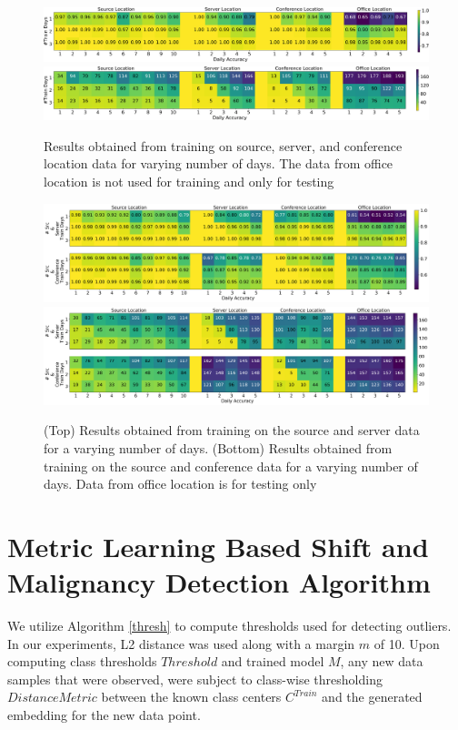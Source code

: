 \documentclass{article}
\begin{document}
\begin{figure}[H]
\includegraphics[width=\linewidth]{figures_supp/Exp2.png} 
\includegraphics[width=\linewidth]{figures_supp/Exp4.png} 
\caption{Results obtained from training on source, server, and conference location data for varying number of days. The data from office location is not used for training and only for testing}
\label{srctrg}
\end{figure}

\begin{figure}[H]
\includegraphics[width=\linewidth]{figures_supp/Exp5.png} 
\includegraphics[width=\linewidth]{figures_supp/Exp5-metric.png} 
\caption{(Top) Results obtained from training on the source and server data for a varying number of days. (Bottom) Results obtained from training on the source and conference data for a varying number of days. Data from office location is for testing only}
\label{srctrgsep}
\end{figure}

\section{Metric Learning Based Shift and Malignancy Detection Algorithm}

We utilize Algorithm \ref{thresh} to compute thresholds used for detecting outliers. In our experiments, L2 distance was used along with a margin $m$ of 10. Upon computing class thresholds $Threshold$ and trained model $M$, any new data samples that were observed, were subject to class-wise thresholding $DistanceMetric$ between the known class centers $C^{Train}$ and the generated embedding for the new data point.   
\end{document}
